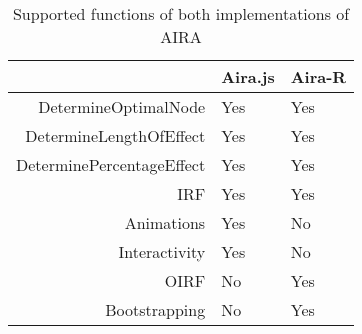 \begin{table}[ht]
\centering
\begin{tabular}{rll}
  \toprule
 & Aira.js & Aira-R \\ 
  \midrule
DetermineOptimalNode & Yes & Yes \\ 
  DetermineLengthOfEffect & Yes & Yes \\ 
  DeterminePercentageEffect & Yes & Yes \\ 
  IRF & Yes & Yes \\ 
  Animations & Yes & No \\ 
  Interactivity & Yes & No \\ 
  OIRF & No & Yes \\ 
  Bootstrapping & No & Yes \\ 
   \bottomrule
\end{tabular}
\caption{Supported functions of both implementations of AIRA} 
\label{tab:supported_functions}
\end{table}
